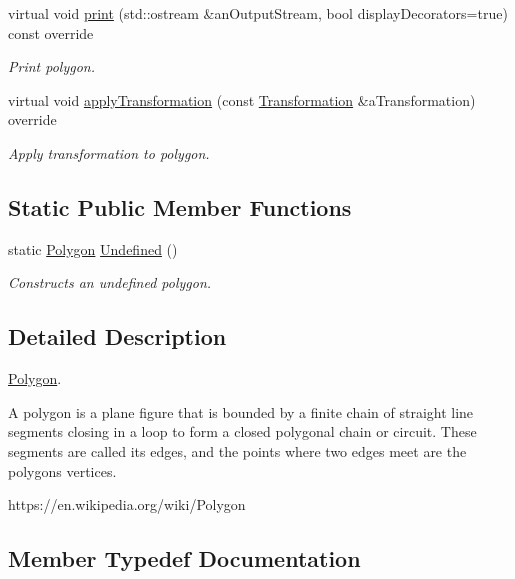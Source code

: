 \begin{DoxyCompactItemize}
virtual void \hyperlink{classlibrary_1_1math_1_1geom_1_1d3_1_1objects_1_1_polygon_a6d30846a912386e5e814e0bffa0a4042}{print} (std\+::ostream \&an\+Output\+Stream, bool display\+Decorators=true) const override
\begin{DoxyCompactList}\small\item\em Print polygon. \end{DoxyCompactList}\item 
virtual void \hyperlink{classlibrary_1_1math_1_1geom_1_1d3_1_1objects_1_1_polygon_a712a6f0b739c0f92f3c64873482da217}{apply\+Transformation} (const \hyperlink{classlibrary_1_1math_1_1geom_1_1d3_1_1_transformation}{Transformation} \&a\+Transformation) override
\begin{DoxyCompactList}\small\item\em Apply transformation to polygon. \end{DoxyCompactList}\end{DoxyCompactItemize}
\subsection*{Static Public Member Functions}
\begin{DoxyCompactItemize}
\item 
static \hyperlink{classlibrary_1_1math_1_1geom_1_1d3_1_1objects_1_1_polygon}{Polygon} \hyperlink{classlibrary_1_1math_1_1geom_1_1d3_1_1objects_1_1_polygon_a40a0601975e2ecb41d903fc9b53dd5b8}{Undefined} ()
\begin{DoxyCompactList}\small\item\em Constructs an undefined polygon. \end{DoxyCompactList}\end{DoxyCompactItemize}


\subsection{Detailed Description}
\hyperlink{classlibrary_1_1math_1_1geom_1_1d3_1_1objects_1_1_polygon}{Polygon}. 

A polygon is a plane figure that is bounded by a finite chain of straight line segments closing in a loop to form a closed polygonal chain or circuit. These segments are called its edges, and the points where two edges meet are the polygon\textquotesingle{}s vertices.

https\+://en.wikipedia.\+org/wiki/\+Polygon 

\subsection{Member Typedef Documentation}
\mbox{\label{classlibrary_1_1math_1_1geom_1_1d3_1_1objects_1_1_polygon_a7962e0559e972fe43eef942ce318fb8d}} 
